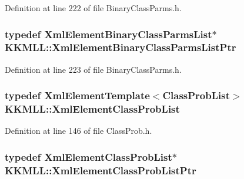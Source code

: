 Definition at line 222 of file Binary\+Class\+Parms.\+h.

\subsubsection[{\texorpdfstring{Xml\+Element\+Binary\+Class\+Parms\+List\+Ptr}{XmlElementBinaryClassParmsListPtr}}]{\setlength{\rightskip}{0pt plus 5cm}typedef {\bf Xml\+Element\+Binary\+Class\+Parms\+List}$\ast$ {\bf K\+K\+M\+L\+L\+::\+Xml\+Element\+Binary\+Class\+Parms\+List\+Ptr}}\hypertarget{namespace_k_k_m_l_l_a28345267a8dd6b1310330e6a9c841bf9}{}\label{namespace_k_k_m_l_l_a28345267a8dd6b1310330e6a9c841bf9}


Definition at line 223 of file Binary\+Class\+Parms.\+h.

\subsubsection[{\texorpdfstring{Xml\+Element\+Class\+Prob\+List}{XmlElementClassProbList}}]{\setlength{\rightskip}{0pt plus 5cm}typedef {\bf Xml\+Element\+Template}$<${\bf Class\+Prob\+List}$>$ {\bf K\+K\+M\+L\+L\+::\+Xml\+Element\+Class\+Prob\+List}}\hypertarget{namespace_k_k_m_l_l_a590810bfbb25bef1964a45832dacea2e}{}\label{namespace_k_k_m_l_l_a590810bfbb25bef1964a45832dacea2e}


Definition at line 146 of file Class\+Prob.\+h.

\subsubsection[{\texorpdfstring{Xml\+Element\+Class\+Prob\+List\+Ptr}{XmlElementClassProbListPtr}}]{\setlength{\rightskip}{0pt plus 5cm}typedef {\bf Xml\+Element\+Class\+Prob\+List}$\ast$ {\bf K\+K\+M\+L\+L\+::\+Xml\+Element\+Class\+Prob\+List\+Ptr}}\hypertarget{namespace_k_k_m_l_l_a99077fb1ba171c086f8bc1d8feb1d190}{}\label{namespace_k_k_m_l_l_a99077fb1ba171c086f8bc1d8feb1d190}


